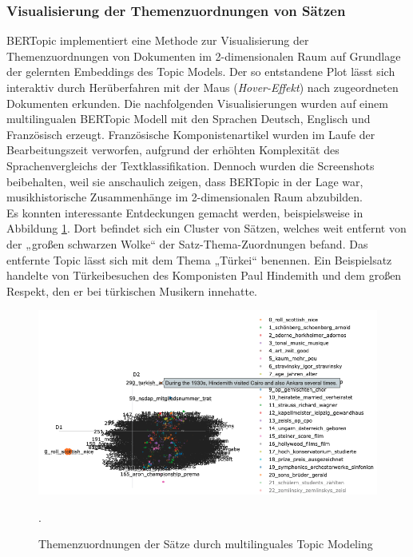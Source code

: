 \documentclass[ngerman]{ttlab-qualify}
\begin{document}
\subsubsection{Visualisierung der Themenzuordnungen von Sätzen}
BERTopic implementiert eine Methode zur Visualisierung der Themenzuordnungen von Dokumenten im 2-dimensionalen Raum auf Grundlage der gelernten Embeddings des Topic Models. Der so entstandene Plot lässt sich interaktiv durch Herüberfahren mit der Maus (\textit{Hover-Effekt}) nach zugeordneten Dokumenten erkunden. Die nachfolgenden Visualisierungen wurden auf einem multilingualen BERTopic Modell mit den Sprachen Deutsch, Englisch und Französisch erzeugt. Französische Komponistenartikel wurden im Laufe der Bearbeitungszeit verworfen, aufgrund der erhöhten Komplexität des Sprachenvergleichs der Textklassifikation. Dennoch wurden die Screenshots beibehalten, weil sie anschaulich zeigen, dass BERTopic in der Lage war, musikhistorische Zusammenhänge im 2-dimensionalen Raum abzubilden.\\ Es konnten interessante Entdeckungen gemacht werden, beispielsweise in Abbildung \ref{bertopic_sätze}. Dort befindet sich ein Cluster von Sätzen, welches weit entfernt von der „großen schwarzen Wolke“ der Satz-Thema-Zuordnungen befand. Das entfernte Topic lässt sich mit dem Thema „Türkei“ benennen. Ein Beispielsatz handelte von Türkeibesuchen des Komponisten Paul Hindemith und dem großen Respekt, den er bei türkischen Musikern innehatte.
\begin{figure}[H]
\begin{center}
\includegraphics[width=16cm]{grafiken/bertopic_sätze.png}
\caption[Themenzuordnungen der Sätze durch multilinguales Topic Modeling]{Themenzuordnungen der Sätze durch multilinguales Topic Modeling}.
\label{bertopic_sätze}
\end{center}
\end{figure} 
\end{document}
